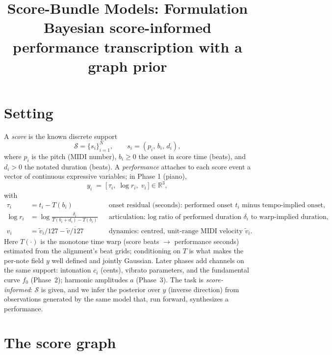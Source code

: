 \documentclass[11pt]{article}
\title{Score-Bundle Models: Formulation\\
\large Bayesian score-informed performance transcription with a graph prior}
\author{}
\date{}
\newcommand{\R}{\mathbb{R}}
\newcommand{\score}{\mathcal{S}}
\begin{document}
\maketitle

\section{Setting}

A \emph{score} is the known discrete support
\begin{equation}
  \score = \{ s_i \}_{i=1}^{N}, \qquad s_i = (p_i,\, b_i,\, d_i),
  \label{eq:support}
\end{equation}
where $p_i$ is the pitch (MIDI number), $b_i \ge 0$ the onset in score time (beats), and
$d_i > 0$ the notated duration (beats). A \emph{performance} attaches to each score event a
vector of continuous expressive variables; in Phase 1 (piano),
\begin{equation}
  y_i \;=\; \bigl[\, \tau_i,\; \log r_i,\; v_i \,\bigr] \in \R^{3},
  \label{eq:variables}
\end{equation}
with
\begin{align}
  \tau_i    &= t_i - T(b_i)                       && \text{onset residual (seconds): performed onset $t_i$ minus tempo-implied onset,} \nonumber\\
  \log r_i  &= \log \frac{\delta_i}{T(b_i + d_i) - T(b_i)} && \text{articulation: log ratio of performed duration $\delta_i$ to warp-implied duration,} \nonumber\\
  v_i       &= \tilde v_i / 127 - \overline{\tilde v/127}  && \text{dynamics: centred, unit-range MIDI velocity $\tilde v_i$.} \nonumber
\end{align}
Here $T(\cdot)$ is the monotone time warp (score beats $\to$ performance seconds) estimated
from the alignment's beat grids; conditioning on $T$ is what makes the per-note field $y$
well defined and jointly Gaussian. Later phases add channels on the same support:
intonation $c_i$ (cents), vibrato parameters, and the fundamental curve $f_0$ (Phase~2);
harmonic amplitudes $a$ (Phase~3). The task is \emph{score-informed}: $\score$ is given,
and we infer the posterior over $y$ (inverse direction) from observations generated by the
same model that, run forward, synthesizes a performance.

\section{The score graph}
\end{document}

